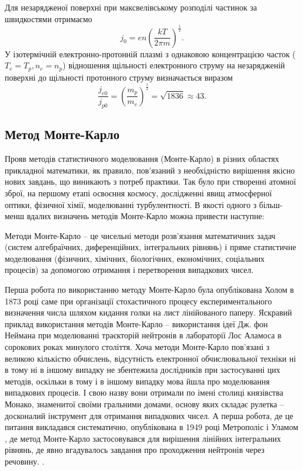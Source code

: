 \documentclass[a4paper,12pt]{article}
\begin{document}
Для незарядженої поверхні при максвелівському розподілі частинок за швидкостями отримаємо
\begin{equation} \label{eq:density}
j_0 = e n \left( \frac{kT}{2 \pi m} \right)^\frac{1}{2}.
\end{equation}
У ізотермічній електронно-протонній плазмі з однаковою концентрацією часток ($T_e = T_p, n_e = n_p$) відношення щільності електронного струму на незарядженій поверхні до щільності протонного струму визначається виразом \cite{novikov}
\[
\frac{j_{e0}}{j_{p0}} = \left( \frac{m_p}{m_e} \right)^\frac{1}{2} = \sqrt{1836} \approx 43.
\]


\subsection{Метод Монте-Карло}
Прояв методів статистичного моделювання (Монте-Карло) в різних областях прикладної математики, як правило, пов'язаний з необхідністю вирішення якісно нових завдань, що виникають з потреб практики. Так було при створенні атомної зброї, на першому етапі освоєння космосу, дослідженні явищ атмосферної оптики, фізичної хімії, моделюванні турбулентності. В якості одного з більш-менш вдалих визначень методів Монте-Карло можна привести наступне:

Методи Монте-Карло -- це чисельні методи розв'язання математичних задач (систем алгебраїчних, диференційних, інтегральних рівнянь) і пряме статистичне моделювання (фізичних, хімічних, біологічних, економічних, соціальних процесів) за допомогою отримання і перетворення випадкових чисел.
 
Перша робота по використанню методу Монте-Карло була опублікована Холом в 1873 році саме при організації стохастичного процесу експериментального визначення числа шляхом кидання голки на лист лінійованого паперу. Яскравий приклад використання методів Монте-Карло -- використання ідеї Дж. фон Неймана при моделюванні траєкторій нейтронів в лабораторії Лос Аламоса в сорокових роках минулого століття. Хоча методи Монте-Карло пов'язані з великою кількістю обчислень, відсутність електронної обчислювальної техніки ні в тому ні в іншому випадку не збентежила дослідників при застосуванні цих методів, оскільки в тому і в іншому випадку мова йшла про моделювання випадкових процесів. І свою назву вони отримали по імені столиці князівства Монако, знаменитої своїми гральними домами, основу яких складає рулетка -- досконалий інструмент для отримання випадкових чисел. А перша робота, де це питання викладався систематично, опублікована в 1949 році Метрополіс і Уламом \cite{Metropolis}, де метод Монте-Карло застосовувався для вирішення лінійних інтегральних рівнянь, де явно вгадувалось завдання про проходження нейтронів через речовину. \cite{belocerkovskyi}.
\end{document}
